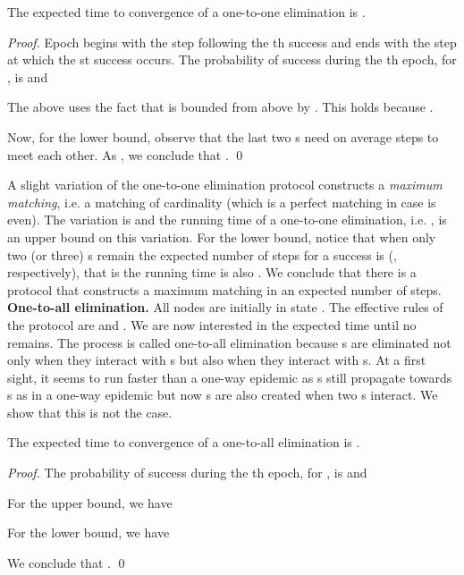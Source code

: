\documentclass[oribibl, 11pt]{llncs}
\begin{document}
\begin{proposition} \label{pro:one-to-one}
The expected time to convergence of a one-to-one elimination is .
\end{proposition}
\begin{proof}
Epoch  begins with the step following the th success and ends with the step at which the st success occurs. The probability of success during the th epoch, for , is  and

The above uses the fact that  is bounded from above by . This holds because .

Now, for the lower bound, observe that the last two s need on average  steps to meet each other. As , we conclude that .
\qed
\end{proof}

A slight variation of the one-to-one elimination protocol constructs a \emph{maximum matching}, i.e. a matching of cardinality  (which is a perfect matching in case  is even). The variation is  and the running time of a one-to-one elimination, i.e. , is an upper bound on this variation. For the lower bound, notice that when only two (or three) s remain the expected number of steps for a success is  (, respectively), that is the running time is also . We conclude that there is a protocol that constructs a maximum matching in an expected number of  steps.\\

\noindent\textbf{One-to-all elimination.} All nodes are initially in state . The effective rules of the protocol are  and . We are now interested in the expected time until no  remains. The process is called one-to-all elimination because s are eliminated not only when they interact with s but also when they interact with s. At a first sight, it seems to run faster than a one-way epidemic as s still propagate towards s as in a one-way epidemic but now s are also created when two s interact. We show that this is not the case.

\begin{proposition} \label{pro:one-to-all}
The expected time to convergence of a one-to-all elimination is .
\end{proposition}
\begin{proof} 
The probability of success during the th epoch, for , is  and


For the upper bound, we have 


For the lower bound, we have

We conclude that .
\qed
\end{proof}
\end{document}
